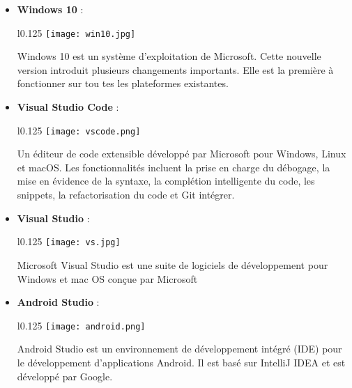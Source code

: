 \begin{itemize}
  \item \textbf{Windows 10} :\\
  \begin{minipage}{\linewidth}
    \begin{wrapfigure}{l}{0.125\textwidth}
      \vspace{-0.5cm}
      \texttt{[image: win10.jpg]} 
    \end{wrapfigure}
    Windows 10 est un système d'exploitation de Microsoft. Cette nouvelle
version introduit plusieurs changements importants. Elle est la
première à fonctionner sur tou
tes les plateformes existantes.
    \end{minipage}

    \vspace{0.5cm}

  \item \textbf{Visual Studio Code} :\\
  \begin{minipage}{\linewidth}
    \begin{wrapfigure}{l}{0.125\textwidth}
      \vspace{-0.5cm}
      \texttt{[image: vscode.png]} 
    \end{wrapfigure}
    Un éditeur de code extensible développé par Microsoft pour Windows, Linux et macOS. Les fonctionnalités incluent
     la prise en charge du débogage, la mise en évidence de la syntaxe, la complétion intelligente du code, les snippets, la refactorisation du code et Git intégrer.
  \end{minipage}
    
  \item \textbf{Visual Studio} :\\
  \begin{minipage}{\linewidth}
    \begin{wrapfigure}{l}{0.125\textwidth}
      \vspace{-0.5cm}
      \texttt{[image: vs.jpg]} 
    \end{wrapfigure}
    Microsoft Visual Studio est une suite de
    logiciels de développement pour Windows
    et mac OS conçue par Microsoft
    \end{minipage}

    \vspace{0.5cm}
    \item \textbf{Android Studio} :\\
    \begin{minipage}{\linewidth}
      \begin{wrapfigure}{l}{0.125\textwidth}
        \vspace{-0.5cm}
        \texttt{[image: android.png]} 
      \end{wrapfigure}
      Android Studio est un environnement de développement intégré (IDE) pour le développement d'applications Android. Il est basé sur IntelliJ IDEA et est développé par Google.
    \end{minipage}


\end{itemize}
